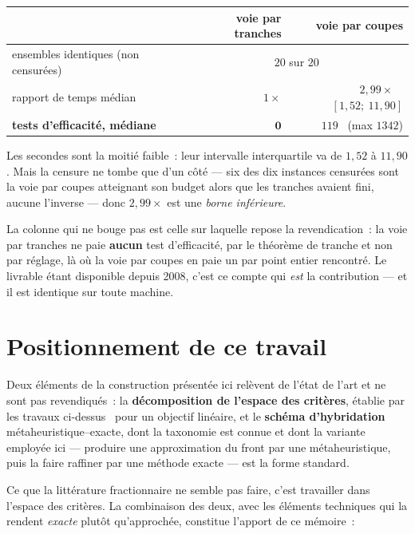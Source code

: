 \documentclass[12pt,a4paper]{report}
\theoremstyle{plain}
\theoremstyle{definition}
\begin{document}
\begin{center}
\begin{tabular}{lrr}
\toprule
 & voie par tranches & voie par coupes \\
\midrule
ensembles identiques (non censurées) & \multicolumn{2}{c}{$20$ sur $20$} \\
rapport de temps médian              & $1\times$ & $2{,}99\times$ \ $[1{,}52;\ 11{,}90]$ \\
\textbf{tests d'efficacité, médiane} & $\mathbf{0}$ & $119$ \ (max $1342$) \\
\bottomrule
\end{tabular}
\end{center}

\noindent
Les secondes sont la moitié faible~: leur intervalle interquartile va de
$1{,}52$ à $11{,}90$.  Mais la censure ne tombe que d'un côté --- six des dix
instances censurées sont la voie par coupes atteignant son budget alors que
les tranches avaient fini, aucune l'inverse --- donc $2{,}99\times$ est une
\emph{borne inférieure}.

La colonne qui ne bouge pas est celle sur laquelle repose la revendication~:
la voie par tranches ne paie \textbf{aucun} test d'efficacité, par le
théorème de tranche et non par réglage, là où la voie par coupes en paie un par
point entier rencontré.  Le livrable étant disponible depuis 2008, c'est ce
compte qui \emph{est} la contribution --- et il est identique sur toute
machine.

\section{Positionnement de ce travail}

Deux éléments de la construction présentée ici relèvent de l'état de l'art et
ne sont pas revendiqués~: la \textbf{décomposition de l'espace des critères},
établie par les travaux ci-dessus~\cite{boland2017,balancedbox,trianglesplitting}
pour un objectif linéaire, et le
\textbf{schéma d'hybridation} métaheuristique--exacte, dont la taxonomie est
connue et dont la variante employée ici --- produire une approximation du front
par une métaheuristique, puis la faire raffiner par une méthode exacte --- est
la forme standard.

Ce que la littérature fractionnaire ne semble pas faire, c'est travailler dans
l'espace des critères.  La combinaison des deux, avec les éléments techniques
qui la rendent \emph{exacte} plutôt qu'approchée, constitue l'apport de ce
mémoire~:
\end{document}
